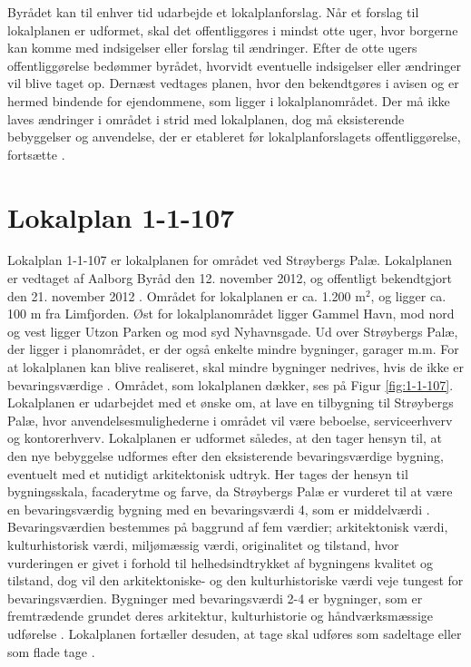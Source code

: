 \newline
Byrådet kan til enhver tid udarbejde et lokalplanforslag. Når et forslag til lokalplanen er udformet, skal det offentliggøres i mindst otte uger, hvor borgerne kan komme med indsigelser eller forslag til ændringer. Efter de otte ugers offentliggørelse bedømmer byrådet, hvorvidt eventuelle indsigelser eller ændringer vil blive taget op. Dernæst vedtages planen, hvor den bekendtgøres i avisen og er hermed bindende for ejendommene, som ligger i lokalplanområdet.
\newline \indent{     }  Der må ikke laves ændringer i området i strid med lokalplanen, dog må eksisterende bebyggelser og anvendelse, der er etableret før lokalplanforslagets offentliggørelse, fortsætte \citep[ s. 4]{lokalplan}.

\section{Lokalplan 1-1-107}
Lokalplan 1-1-107 er lokalplanen for området ved Strøybergs Palæ. Lokalplanen er vedtaget af Aalborg Byråd den 12. november 2012, og offentligt bekendtgjort den 21. november 2012 \citep[ s. 20]{lokalplan}.
\newline \indent{     }  Området for lokalplanen er ca. 1.200 $\text{m}^2$, og ligger ca. 100 m fra Limfjorden. Øst for lokalplanområdet ligger Gammel Havn, mod nord og vest ligger Utzon Parken og mod syd Nyhavnsgade. Ud over Strøybergs Palæ, der ligger i planområdet, er der også enkelte mindre bygninger, garager m.m. For at lokalplanen kan blive realiseret, skal mindre bygninger nedrives, hvis de ikke er bevaringsværdige \citep[ s. 6]{lokalplan}. Området, som lokalplanen dækker, ses på Figur \ref{fig:1-1-107}.
\newline \indent{     }  Lokalplanen er udarbejdet med et ønske om, at lave en tilbygning til Strøybergs Palæ, hvor anvendelsesmulighederne i området vil være beboelse, serviceerhverv og kontorerhverv. Lokalplanen er udformet således, at den tager hensyn til, at den nye bebyggelse udformes efter den eksisterende bevaringsværdige bygning, eventuelt med et nutidigt arkitektonisk udtryk. Her tages der hensyn til bygningsskala, facaderytme og farve, da Strøybergs Palæ er vurderet til at være en bevaringsværdig bygning med en bevaringsværdi 4, som er middelværdi \citep[ s. 5 og 9]{lokalplan}. Bevaringsværdien bestemmes på baggrund af fem værdier; arkitektonisk værdi, kulturhistorisk værdi, miljømæssig værdi, originalitet og tilstand, hvor vurderingen er givet i forhold til helhedsindtrykket af bygningens kvalitet og tilstand, dog vil den arkitektoniske- og den kulturhistoriske værdi veje tungest for bevaringsværdien. Bygninger med bevaringsværdi 2-4 er bygninger, som er fremtrædende grundet deres arkitektur, kulturhistorie og håndværksmæssige udførelse \citep{bevaringsvaerdi}. Lokalplanen fortæller desuden, at tage skal udføres som sadeltage eller som flade tage \citep[ s. 17]{lokalplan}.

